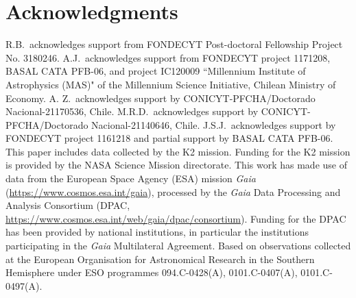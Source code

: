 \documentclass[useAMS,usenatbib]{mnras}
\begin{document}
\section*{Acknowledgments}
R.B.\ acknowledges support from FONDECYT Post-doctoral Fellowship Project No. 3180246.
A.J.\ acknowledges support from FONDECYT project 1171208,
BASAL CATA PFB-06, and project IC120009 ``Millennium Institute
of Astrophysics (MAS)" of the Millennium Science Initiative,
Chilean Ministry of Economy. 
A. Z.\ acknowledges support by CONICYT-PFCHA/Doctorado Nacional-21170536, Chile.
M.R.D.\ acknowledges support by CONICYT-PFCHA/Doctorado Nacional-21140646, Chile.
J.S.J.\ acknowledges support by FONDECYT project 1161218 and partial support by BASAL CATA PFB-06.
This paper includes data collected by the K2 mission. Funding
for the K2 mission is provided by the NASA Science Mission directorate.
This work has made use of data from the European Space Agency (ESA)
mission {\it Gaia} (\url{https://www.cosmos.esa.int/gaia}), processed by
the {\it Gaia} Data Processing and Analysis Consortium (DPAC,
\url{https://www.cosmos.esa.int/web/gaia/dpac/consortium}). Funding
for the DPAC has been provided by national institutions, in particular
the institutions participating in the {\it Gaia} Multilateral Agreement.
Based on observations collected at the European Organisation for Astronomical
Research in the Southern Hemisphere under ESO programmes 094.C-0428(A), 0101.C-0407(A), 0101.C-0497(A).



\end{document}

